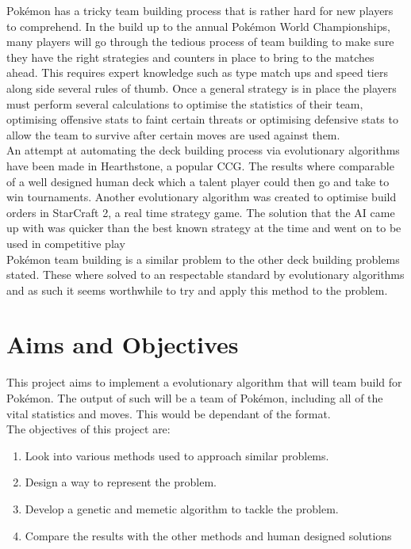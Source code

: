 \documentclass[a4paper]{article}
\newcommand{\Pokemon}{Pok\'{e}mon}
\begin{document}
\Pokemon{} has a tricky team building process that is rather hard for new players to comprehend. In the build up to the annual \Pokemon{} World Championships, many players will go through the tedious process of team building to make sure they have the right strategies and counters in place to bring to the matches ahead\cite{worldsOverview}. This requires expert knowledge such as type match ups and speed tiers along side several rules of thumb. Once a general strategy is in place the players must perform several calculations to optimise the statistics of their team, optimising offensive stats to faint certain threats or optimising defensive stats to allow the team to survive after certain moves are used against them.\\
An attempt at automating the deck building process via evolutionary algorithms have been made in Hearthstone, a popular CCG\cite{hearthstoneAI}. The results where comparable of a well designed human deck which a talent player could then go and take to win tournaments. Another evolutionary algorithm was created to optimise build orders in StarCraft 2, a real time strategy game. The solution that the AI came up with was quicker than the best known strategy at the time and went on to be used in competitive play\cite{starcraftEA}\\
\Pokemon{} team building is a similar problem to the other deck building problems stated. These where solved to an respectable standard by evolutionary algorithms and as such it seems worthwhile to try and apply this method to the problem.

\section{Aims and Objectives}
This project aims to implement a evolutionary algorithm that will team build for \Pokemon{}. The output of such will be a team of \Pokemon{}, including all of the vital statistics and moves. This would be dependant of the format.\\
The objectives of this project are:
\begin{enumerate}
    \item Look into various methods used to approach similar problems.
    \item Design a way to represent the problem.
    \item Develop a genetic and memetic algorithm to tackle the problem.
    \item Compare the results with the other methods and human designed solutions
\end{enumerate}
\end{document}
